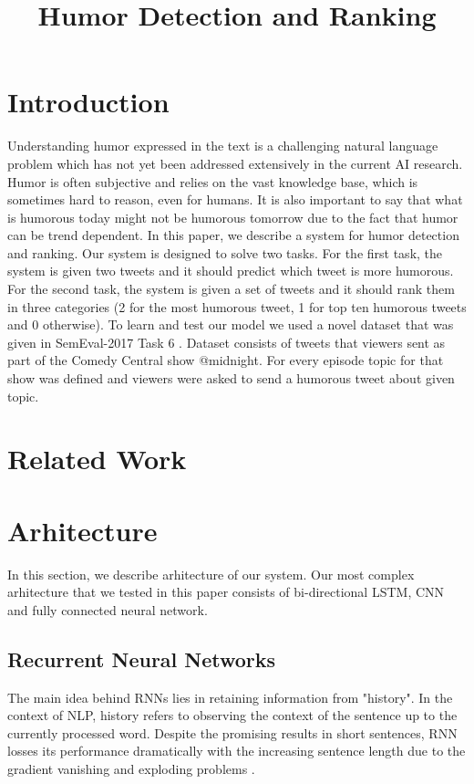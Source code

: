 \documentclass[10pt, a4paper]{article}
\title{Humor Detection and Ranking}
\begin{document}
\maketitleabstract

\section{Introduction}

Understanding humor expressed in the text is a challenging natural language problem which has not yet been addressed extensively in the current AI research. Humor is often subjective and relies on the vast knowledge base, which is sometimes hard to reason, even for humans. It is also important to say that what is humorous today might not be humorous tomorrow due to the fact that humor can be trend dependent.
In this paper, we describe a system for humor detection and ranking. Our system is designed to solve two tasks. For the first task, the system is given two tweets and it should predict which tweet is more humorous. For the second task, the system is given a set of tweets and it should rank them in three categories (2 for the most humorous tweet, 1 for top ten humorous tweets and 0 otherwise). 
To learn and test our model we used a novel dataset that was given in SemEval-2017 Task 6 \citep{potash2016hashtagwars}. Dataset consists of tweets that viewers sent as part of the Comedy Central show @midnight. For every episode topic for that show was defined and viewers were asked to send a humorous tweet about given topic. 

\section{Related Work}


\section{Arhitecture}
In this section, we describe arhitecture of our system. Our most complex arhitecture that we tested in this paper consists of bi-directional LSTM, CNN and fully connected neural network.

\subsection{Recurrent Neural Networks}
The main idea behind RNNs lies in retaining information from "history".
In the context of NLP, history refers to observing the context of the
sentence up to the currently processed word. Despite the promising results in short
sentences, RNN losses its performance dramatically with the increasing sentence
length due to the gradient vanishing\cite{bengio1994learning}
and exploding problems \cite{pascanu2013difficulty}.
\end{document}
